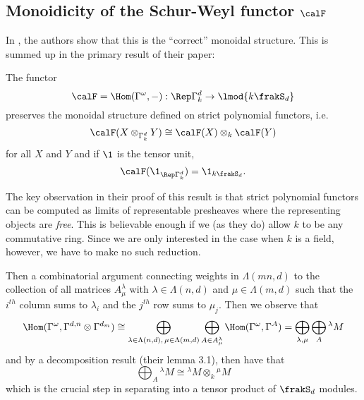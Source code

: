 \documentclass[12pt]{article}
\begin{document}
\subsection{Monoidicity of the Schur-Weyl functor \texorpdfstring{$\calF$}{F}}
In \cite{aquilino-reischuk}, the authors show that this is the ``correct'' monoidal structure. This is summed up 
in the primary result of their paper:
\begin{thm}
	The functor 
	\[\calF=\Hom(\Gamma^\omega,-):\Rep\Gamma^d_k\to \lmod{k\frakS_d}\]
	preserves the monoidal structure defined on strict polynomial functors, i.e.
	\[\calF(X\otimes_{\Gamma_k^d}Y)\cong\calF(X)\otimes_k\calF(Y)\]
	for all $X$ and $Y$ and if $\1$ is the tensor unit, 
	\[\calF(\1_{\Rep\Gamma^d_k})=\1_{k\frakS_d}.\]
\end{thm}

The key observation in their proof of this result is that strict polynomial functors can be computed 
as limits of representable presheaves where the representing objects are \textit{free}. This is believable enough 
if we (as they do) allow $k$ to be any commutative ring. Since we are only interested in the case when $k$ is a field, however,
we have to make no such reduction.

Then a combinatorial argument connecting weights in $\Lambda(mn,d)$ to the collection of all matrices $A^\lambda_\mu$ with $\lambda\in\Lambda(n,d)$ and $\mu\in\Lambda(m,d)$ such that the $i^{th}$ column sums to $\lambda_i$ and the 
$j^{th}$ row sums to $\mu_j$. Then we observe that
\[\Hom(\Gamma^\omega,\Gamma^{d,n}\otimes\Gamma^{d_m})\cong\bigoplus_{\lambda\in\Lambda(n,d),\,\mu\in\Lambda(m,d)}\bigoplus_{A\in A^\lambda_\mu}\Hom(\Gamma^\omega,\Gamma^A)=\bigoplus_{\lambda,\mu}\bigoplus_A{^\lambda M}\]
and by a decomposition result (their lemma 3.1), then have that 
\[\bigoplus_A {^\lambda M}\cong{^\lambda M}\otimes_k{^\mu M}\]
which is the crucial step in separating into a tensor product of $\frakS_d$ modules.


\newpage
\end{document}
